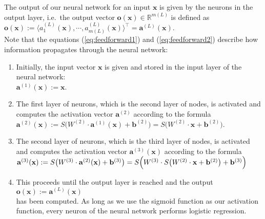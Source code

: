 The output of our neural network for an input $\mathbf{x}$ is given by the neurons in the output
layer,  i.e.~the output vector 
$\mathbf{o}(\mathbf{x}) \in \mathbb{R}^{m(L)}$ is defined as 
\\[0.2cm]
\hspace*{1.3cm}
$\mathbf{o}(\mathbf{x}) := \langle a^{(L)}_1(\mathbf{x}), \cdots, a^{(L)}_{m(L)}(\mathbf{x}) \rangle^\top = \mathbf{a}^{(L)}(\mathbf{x})$.
\\[0.2cm]
Note that the equations (\ref{eq:feedforward1}) and (\ref{eq:feedforward2}) describe how information propagates
through the neural network: 
\begin{enumerate}
\item Initially, the input vector $\mathbf{x}$ is given and stored in the input layer of the neural network:
      \\[0.2cm]
      \hspace*{1.3cm}
      $\mathbf{a}^{(1)}(\mathbf{x}) := \mathbf{x}$.
\item The first layer of neurons, which is the second layer of nodes,  is activated and computes the activation
      vector $\mathbf{a}^{(2)}$ according to the formula
      \\[0.2cm]
      \hspace*{1.3cm}
      $\mathbf{a}^{(2)}(\mathbf{x}) := S\bigl(W^{(2)} \cdot \mathbf{a}^{(1)}(\mathbf{x}) + \mathbf{b}^{(2)}\bigr) = 
                                        S\bigl(W^{(2)} \cdot \mathbf{x} + \mathbf{b}^{(2)}\bigr)
      $.
\item The second layer of neurons, which is the third layer of nodes,  is activated and computes the activation
      vector $\mathbf{a}^{(3)}(\mathbf{x})$ according to the formula
      \\[0.2cm]
      \hspace*{1.3cm}
      $\mathbf{a}^{(3)}(\mathbf{x}) := S\bigl(W^{(3)} \cdot \mathbf{a}^{(2)}(\mathbf{x}) + \mathbf{b}^{(3)}\bigr)
                          = S\Bigl(W^{(3)} \cdot S\bigl(W^{(2)} \cdot \mathbf{x} + \mathbf{b}^{(2)}\bigr) + \mathbf{b}^{(3)}\Bigr)
        $
\item This proceeds until the output layer is reached and the output
      \\[0.2cm]
      \hspace*{1.3cm}
      $\mathbf{o}(\mathbf{x}) := \mathbf{a}^{(L)}(\mathbf{x})$
      \\[0.2cm]
      has been computed.  As long as we use the sigmoid function as our activation function, every neuron of
      the neural network performs logistic regression. 
\end{enumerate}
